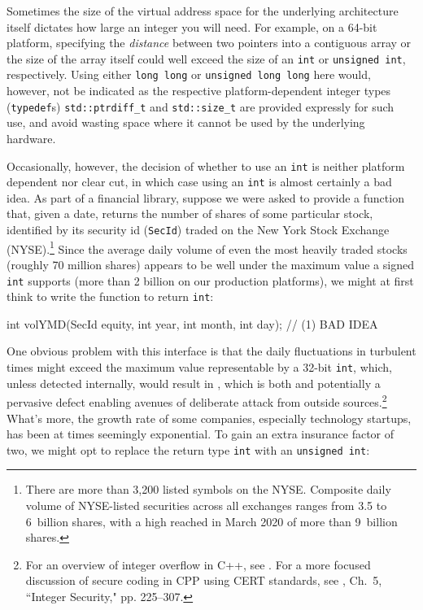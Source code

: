 Sometimes the size of the virtual address space for the
underlying architecture itself dictates how large an integer you will
need. For example, on a 64-bit platform, specifying the \emph{distance} between two pointers
into a contiguous array or the size of the array itself could well exceed the size of an \lstinline!int! or
\lstinline!unsigned!~\lstinline!int!, respectively. Using either
\lstinline!long!~\lstinline!long! or
\lstinline!unsigned!~\lstinline!long!~\lstinline!long! here would, however, not
be indicated as the respective platform-dependent integer types
(\lstinline!typedef!s) \lstinline!std::ptrdiff_t! and \lstinline!std::size_t!
are provided expressly for such use, and avoid wasting space where it
cannot be used by the underlying hardware.

Occasionally, however, the decision of whether to use an \lstinline!int! is
neither platform dependent nor clear cut, in which case using an
\lstinline!int! is almost certainly a bad idea. As part of a financial
library, suppose we were asked to provide a function that, given a date,
returns the number of shares of some particular stock, identified by its
security id (\lstinline!SecId!) traded on the New York Stock Exchange
(NYSE).\footnote{There are more than 3,200 listed symbols on the NYSE. Composite daily volume of NYSE-listed securities across all exchanges  ranges from 3.5 to 6~billion shares, with a high reached in March 2020 of more than 9~billion shares.} Since the average daily volume of even the most heavily traded stocks (roughly 70 million shares) appears to
be well under the maximum value a signed \lstinline!int! supports (more
than 2 billion on our production platforms), we might at first think to write the function
to return \lstinline!int!:

\begin{emcppslisting}[language=C++]
int volYMD(SecId equity, int year, int month, int day);  // (1) BAD IDEA
\end{emcppslisting}
    
\noindent One obvious problem with this interface is that the daily fluctuations
in turbulent times might exceed the maximum value representable by a
32-bit \lstinline!int!, which, unless detected internally, would result in
, which is both  and potentially a pervasive defect enabling avenues of deliberate attack from outside sources.{\cprotect\footnote{For an overview of integer overflow in C++, see \cite{ballman}. For a more focused discussion of secure coding in CPP using CERT standards, see \cite{seacord13}, Ch.~5, ``Integer Security," pp. 225--307.}} What's more, the growth rate of some companies,
especially technology startups, has
been at times seemingly exponential. To gain an extra
insurance factor of two, we might opt to replace the return type
\lstinline!int! with an \lstinline!unsigned!~\lstinline!int!:

